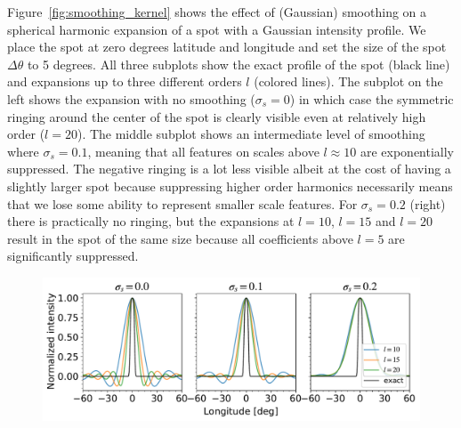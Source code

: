 \documentclass[modern]{aastex62}
\begin{document}
Figure~\ref{fig:smoothing_kernel} shows the effect of (Gaussian) smoothing on a spherical harmonic expansion of a spot with a Gaussian intensity profile.
We place the spot at zero degrees latitude and longitude and set the size of the spot $\Delta\theta$ to 5 degrees.
All three subplots show the exact profile of the spot (black line) and expansions up to three different orders $l$ (colored lines).
The subplot on the left shows the expansion with no smoothing ($\sigma_s=0$) in which case the symmetric ringing around the center of the spot is clearly visible even at relatively high order ($l=20$).
The middle subplot shows an intermediate level of smoothing where $\sigma_s=0.1$, meaning that all features on scales above $l\approx 10$ are exponentially suppressed.
The negative ringing is a lot less visible albeit at the cost of having a slightly larger spot because suppressing higher order harmonics necessarily means that we lose some ability to represent smaller scale features.
For $\sigma_s=0.2$ (right) there is practically no ringing, but the expansions at $l=10$, $l=15$ and $l=20$ result in the spot of the same size because all coefficients above $l=5$ are significantly suppressed.

\begin{figure}[h!]
    \begin{centering}
    \includegraphics[width=1.\linewidth]{figures/smoothing_kernel.pdf}
    \end{centering}
\end{figure}
\end{document}
